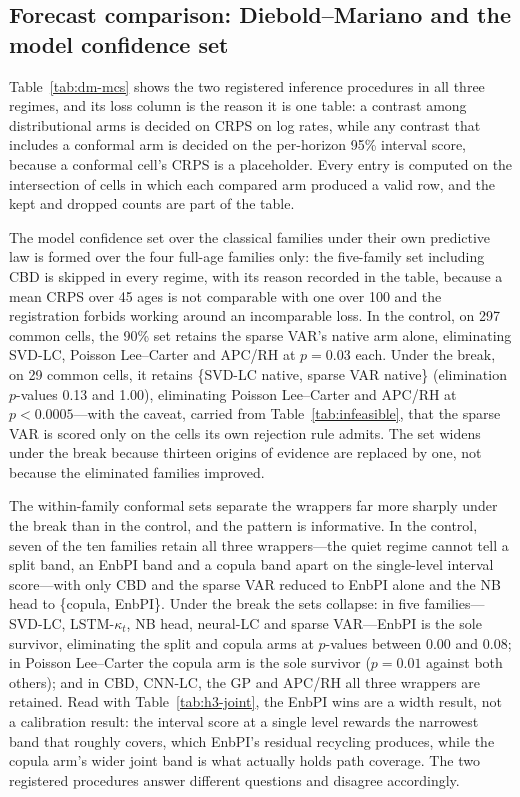 \subsection{Forecast comparison: Diebold--Mariano and the model confidence set}


Table~\ref{tab:dm-mcs} shows the two registered inference procedures in
all three regimes, and its loss column is the reason it is one table: a
contrast among distributional arms is decided on CRPS on log rates, while
any contrast that includes a conformal arm is decided on the per-horizon
95\% interval score, because a conformal cell's CRPS is a placeholder.
Every entry is computed on the intersection of cells in which each
compared arm produced a valid row, and the kept and dropped counts are
part of the table.

The model confidence set over the classical families under their own
predictive law is formed over the four full-age families only: the
five-family set including CBD is skipped in every regime, with its reason
recorded in the table, because a mean CRPS over 45 ages is not comparable
with one over 100 and the registration forbids working around an
incomparable loss. In the control, on 297 common cells, the 90\% set
retains the sparse VAR's native arm alone, eliminating SVD-LC, Poisson
Lee--Carter and APC/RH at $p=0.03$ each. Under the break, on 29 common
cells, it retains \{SVD-LC native, sparse VAR native\} (elimination
$p$-values 0.13 and 1.00), eliminating Poisson Lee--Carter and APC/RH at
$p<0.0005$---with the caveat, carried from Table~\ref{tab:infeasible}, that
the sparse VAR is scored only on the cells its own rejection rule admits.
The set widens under the break because thirteen origins of evidence are
replaced by one, not because the eliminated families improved.

The within-family conformal sets separate the wrappers far more sharply
under the break than in the control, and the pattern is informative. In
the control, seven of the ten families retain all three wrappers---the
quiet regime cannot tell a split band, an EnbPI band and a copula band
apart on the single-level interval score---with only CBD and the sparse
VAR reduced to EnbPI alone and the NB head to \{copula, EnbPI\}. Under the
break the sets collapse: in five families---SVD-LC, LSTM-$\kappa_t$, NB
head, neural-LC and sparse VAR---EnbPI is the sole survivor, eliminating
the split and copula arms at $p$-values between 0.00 and 0.08; in Poisson
Lee--Carter the copula arm is the sole survivor ($p=0.01$ against both
others); and in CBD, CNN-LC, the GP and APC/RH all three wrappers are
retained. Read with Table~\ref{tab:h3-joint}, the EnbPI wins are a width
result, not a calibration result: the interval score at a single level
rewards the narrowest band that roughly covers, which EnbPI's residual
recycling produces, while the copula arm's wider joint band is what
actually holds path coverage. The two registered procedures answer
different questions and disagree accordingly.

